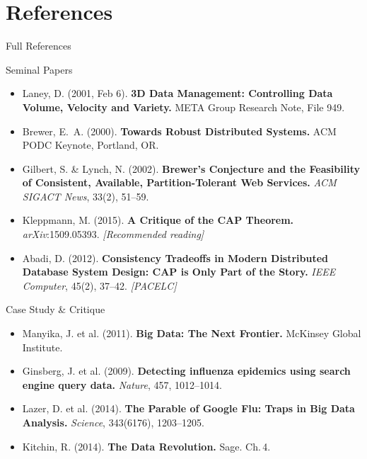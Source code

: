 \documentclass[aspectratio=169,10pt]{beamer}
\begin{document}
\section*{References}

\begin{frame}{Full References}
  \begin{block}{Seminal Papers}
    \begin{itemize}
      \small
      \item Laney, D. (2001, Feb 6). \textbf{3D Data Management: Controlling Data Volume, Velocity and Variety.} META Group Research Note, File 949.
      \item Brewer, E.\ A. (2000). \textbf{Towards Robust Distributed Systems.} ACM PODC Keynote, Portland, OR.
      \item Gilbert, S. \& Lynch, N. (2002). \textbf{Brewer's Conjecture and the Feasibility of Consistent, Available, Partition-Tolerant Web Services.} \textit{ACM SIGACT News}, 33(2), 51--59.
      \item Kleppmann, M. (2015). \textbf{A Critique of the CAP Theorem.} \textit{arXiv}:1509.05393. \textit{[Recommended reading]}
      \item Abadi, D. (2012). \textbf{Consistency Tradeoffs in Modern Distributed Database System Design: CAP is Only Part of the Story.} \textit{IEEE Computer}, 45(2), 37--42. \textit{[PACELC]}
    \end{itemize}
  \end{block}
  \vspace{4pt}
  \begin{exampleblock}{Case Study \& Critique}
    \begin{itemize}
      \small
      \item Manyika, J. et al. (2011). \textbf{Big Data: The Next Frontier.} McKinsey Global Institute.
      \item Ginsberg, J. et al. (2009). \textbf{Detecting influenza epidemics using search engine query data.} \textit{Nature}, 457, 1012--1014.
      \item Lazer, D. et al. (2014). \textbf{The Parable of Google Flu: Traps in Big Data Analysis.} \textit{Science}, 343(6176), 1203--1205.
      \item Kitchin, R. (2014). \textbf{The Data Revolution.} Sage. Ch.\,4.
    \end{itemize}
  \end{exampleblock}
\end{frame}
\end{document}
